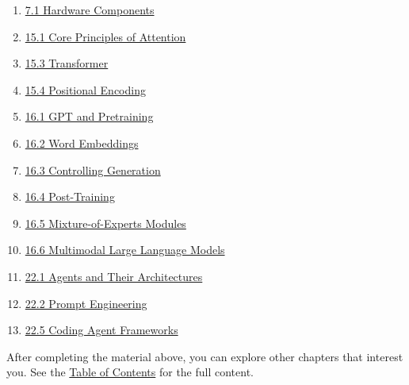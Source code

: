 \begin{enumerate}
\item
  \href{docs-en/01-deep-learning/07-computational-performance-and-ai-infra/07-01-hardware-components.md}{7.1 Hardware Components}
\item
  \href{docs-en/03-large-language-model/15-attention-mechanisms-and-transformer/15-01-core-principles-of-attention.md}{15.1 Core Principles of Attention}
\item
  \href{docs-en/03-large-language-model/15-attention-mechanisms-and-transformer/15-03-transformer.md}{15.3 Transformer}
\item
  \href{docs-en/03-large-language-model/15-attention-mechanisms-and-transformer/15-04-positional-encoding.md}{15.4 Positional Encoding}
\item
  \href{docs-en/03-large-language-model/16-fundamentals-of-large-language-models/16-01-gpt-and-pretraining.md}{16.1 GPT and Pretraining}
\item
  \href{docs-en/03-large-language-model/16-fundamentals-of-large-language-models/16-02-word-embeddings.md}{16.2 Word Embeddings}
\item
  \href{docs-en/03-large-language-model/16-fundamentals-of-large-language-models/16-03-controlling-generation.md}{16.3 Controlling Generation}
\item
  \href{docs-en/03-large-language-model/16-fundamentals-of-large-language-models/16-04-post-training.md}{16.4 Post-Training}
\item
  \href{docs-en/03-large-language-model/16-fundamentals-of-large-language-models/16-05-mixture-of-experts-modules.md}{16.5 Mixture-of-Experts Modules}
\item
  \href{docs-en/03-large-language-model/16-fundamentals-of-large-language-models/16-06-multimodal-large-language-models.md}{16.6 Multimodal Large Language Models}
\item
  \href{docs-en/04-llm-agents/22-agents/22-01-agents-and-their-architectures.md}{22.1 Agents and Their Architectures}
\item
  \href{docs-en/04-llm-agents/22-agents/22-02-prompt-engineering.md}{22.2 Prompt Engineering}
\item
  \href{docs-en/04-llm-agents/22-agents/22-05-coding-agent-frameworks.md}{22.5 Coding Agent Frameworks}
\end{enumerate}

After completing the material above, you can explore other chapters that interest you. See the \href{TABLE_OF_CONTENTS_EN.md}{Table of Contents} for the full content.

\clearpage
